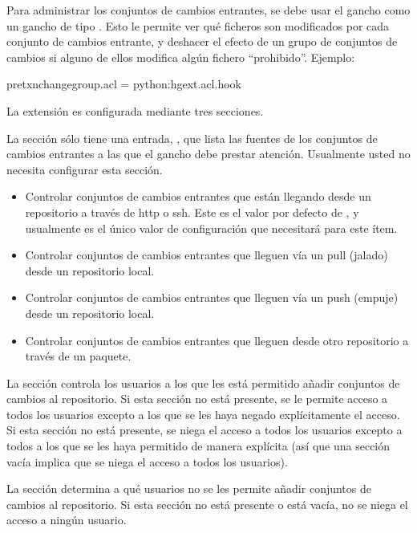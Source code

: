 Para administrar los conjuntos de cambios entrantes, se debe usar el
gancho  como un gancho de tipo .
Esto le permite ver qué ficheros son modificados por cada conjunto de
cambios entrante, y deshacer el efecto de un grupo de conjuntos de
cambios si alguno de ellos modifica algún fichero ``prohibido''.
Ejemplo:
\begin{codesample2}
  [hooks]
  pretxnchangegroup.acl = python:hgext.acl.hook
\end{codesample2}

La extensión  es configurada mediante tres secciones.

La sección  sólo tiene una entrada,
, que lista las fuentes de los
conjuntos de cambios entrantes a las que el gancho debe prestar
atención. Usualmente usted no necesita configurar esta sección.
\begin{itemize}
  \item[\rcitem{acl}{serve}] Controlar conjuntos de
    cambios entrantes que están llegando desde un repositorio a
    través de http o ssh. Este es el valor por defecto de
  , y usualmente es el único valor de
  configuración que necesitará para este ítem.
\item[\rcitem{acl}{pull}] Controlar conjuntos de cambios entrantes que
  lleguen vía un pull (jalado) desde un repositorio local.
\item[\rcitem{acl}{push}] Controlar conjuntos de cambios entrantes que
  lleguen vía un push (empuje) desde un repositorio local.
\item[\rcitem{acl}{bundle}] Controlar conjuntos de cambios entrantes
  que lleguen desde otro repositorio a través de un paquete.
\end{itemize}

La sección  controla los usuarios a los que les
está permitido añadir conjuntos de cambios al repositorio. Si esta
sección no está presente, se le permite acceso a todos los usuarios
excepto  a los que se les haya negado explícitamente el acceso. Si
esta sección no está presente, se niega el acceso a todos los usuarios
excepto a todos a los que se les haya permitido de manera explícita
(así que una sección vacía implica que se niega el acceso a todos los
usuarios).

La sección  determina a qué usuarios no se les
permite añadir conjuntos de cambios al repositorio. Si esta sección no
está presente o está vacía, no se niega el acceso a ningún usuario.

